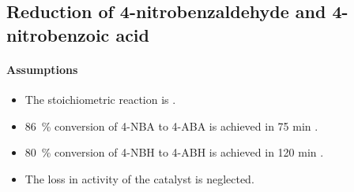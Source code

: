 

\subsection{Reduction of 4-nitrobenzaldehyde and 4-nitrobenzoic acid}
\paragraph{Assumptions}
\begin{itemize}
    \item The stoichiometric reaction is  \cite{gowda_catalytic_2000}.
    \item \SI{86}{\percent} conversion of 4-NBA to 4-ABA is achieved in 75 min \cite{gowda_catalytic_2000}.
     \item \SI{80}{\percent} conversion of 4-NBH to 4-ABH is achieved in 120 min \cite{gowda_catalytic_2000}.
    \item The loss in activity of the catalyst is neglected.
\end{itemize}